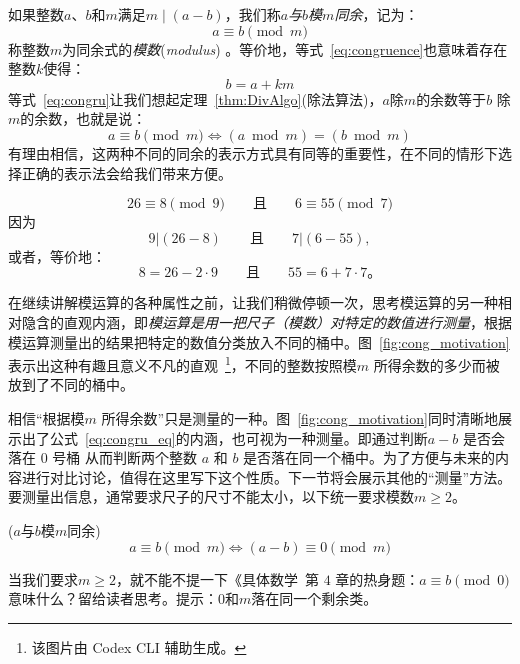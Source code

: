 如果整数$a$、$b$和$m$满足$m\mid (a - b)$，我们称\emph{$a$与$b$模$m$同余}，记为：
\begin{equation}
\label{eq:congruence}
a \equiv b \pmod{m}
\end{equation}
称整数$m$为同余式的\emph{模数}(\emph{modulus}) 。等价地，等式~\ref{eq:congruence}也意味着存在整数$k$使得：
\begin{equation}
\label{eq:congru}
b = a + km
\end{equation}
等式~\ref{eq:congru}让我们想起定理~\ref{thm:DivAlgo}(除法算法)，$a$除$m$的余数等于$b$ 除 $m$的余数，也就是说：
\begin{equation}
\label{eq:congru_eq}
a \equiv b \pmod{m} \iff (a \bmod m) = (b \bmod m)
\end{equation}
有理由相信，这两种不同的同余的表示方式具有同等的重要性，在不同的情形下选择正确的表示法会给我们带来方便。

\begin{example} 
\[26 \equiv 8 \pmod{9} \qquad \text{且}\qquad 6 \equiv 55 \pmod{7}\]
因为
\[9 | (26 - 8)\qquad \text{且}\qquad 7 | (6 - 55),\]
或者，等价地：
\[ 8 = 26 - 2 \cdot 9 \qquad \text{且}\qquad 55 = 6 + 7 \cdot 7\text{。}\]
\end{example}

在继续讲解模运算的各种属性之前，让我们稍微停顿一次，思考模运算的另一种相对隐含的直观内涵，即\emph{模运算是用一把尺子（模数）对特定的数值进行测量}，根据模运算测量出的结果把特定的数值分类放入不同的桶中。图~\ref{fig:cong_motivation}表示出这种有趣且意义不凡的直观~\footnote{该图片由 Codex CLI 辅助生成。}，不同的整数按照模$m$ 所得余数的多少而被放到了不同的桶中。

相信“根据模$m$ 所得余数”只是测量的一种。图~\ref{fig:cong_motivation}同时清晰地展示出了公式~\ref{eq:congru_eq}的内涵，也可视为一种测量。即通过判断$a - b$ 是否会落在 $0$ 号桶 从而判断两个整数 $a$ 和 $b$ 是否落在同一个桶中。为了方便与未来的内容进行对比讨论，值得在这里写下这个性质。下一节将会展示其他的“测量”方法。要测量出信息，通常要求尺子的尺寸不能太小，以下统一要求模数$m \ge 2$。

\begin{property}{($a$与$b$模$m$同余)}
\label{prop:congruence}
\[ a \equiv b \pmod{m} \iff (a - b) \equiv 0 \pmod{m}\]
\end{property}

\begin{thinking}
  当我们要求$m \ge 2$，就不能不提一下《具体数学~\cite{GKP94}第 $4$ 章的热身题：$a \equiv b \pmod{0}$ 意味什么？留给读者思考。提示：$0$和$m$落在同一个剩余类。
\end{thinking}

